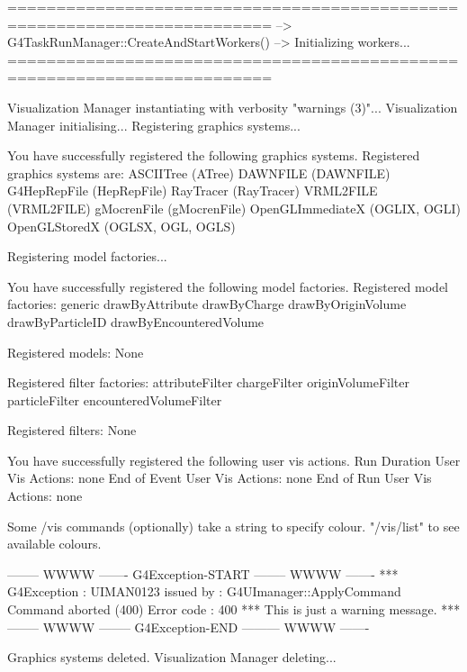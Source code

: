 =========================================================================
--> G4TaskRunManager::CreateAndStartWorkers() --> Initializing workers...
=========================================================================

Visualization Manager instantiating with verbosity "warnings (3)"...
Visualization Manager initialising...
Registering graphics systems...

You have successfully registered the following graphics systems.
Registered graphics systems are:
  ASCIITree (ATree)
  DAWNFILE (DAWNFILE)
  G4HepRepFile (HepRepFile)
  RayTracer (RayTracer)
  VRML2FILE (VRML2FILE)
  gMocrenFile (gMocrenFile)
  OpenGLImmediateX (OGLIX, OGLI)
  OpenGLStoredX (OGLSX, OGL, OGLS)

Registering model factories...

You have successfully registered the following model factories.
Registered model factories:
  generic
  drawByAttribute
  drawByCharge
  drawByOriginVolume
  drawByParticleID
  drawByEncounteredVolume

Registered models:
  None

Registered filter factories:
  attributeFilter
  chargeFilter
  originVolumeFilter
  particleFilter
  encounteredVolumeFilter

Registered filters:
  None

You have successfully registered the following user vis actions.
Run Duration User Vis Actions: none
End of Event User Vis Actions: none
End of Run User Vis Actions: none

Some /vis commands (optionally) take a string to specify colour.
"/vis/list" to see available colours.

-------- WWWW ------- G4Exception-START -------- WWWW -------
*** G4Exception : UIMAN0123
      issued by : G4UImanager::ApplyCommand
Command aborted (400)
Error code : 400
*** This is just a warning message. ***
-------- WWWW -------- G4Exception-END --------- WWWW -------

Graphics systems deleted.
Visualization Manager deleting...
